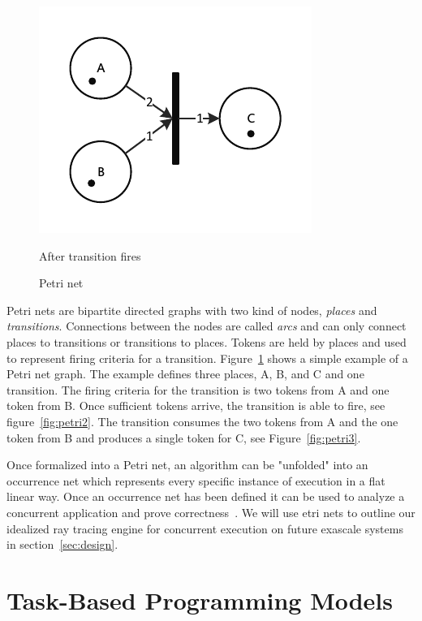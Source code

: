 \begin{figure}[!htb]
  \includegraphics[width=\linewidth]{drawings/Petri3.pdf}
  \caption{After transition fires}\label{fig:petri3}
\endminipage
\caption{Petri net}
\label{fig:petri}
\end{figure}

Petri nets are bipartite directed graphs with two kind of nodes, \emph{places}
and \emph{transitions}.  Connections between the nodes are called \emph{arcs}
and can only connect places to transitions or transitions to places.  Tokens are
held by places and used to represent firing criteria for a transition.  
Figure~\ref{fig:petri} shows a simple example of a Petri net graph.  The 
example defines three places, A, B, and C and one transition.  The firing 
criteria for the transition is two tokens from A and one token from B.  Once 
sufficient tokens arrive, the transition is able to fire, see 
figure~\ref{fig:petri2}.  The transition consumes the two tokens from A and the
one token from B and produces a single token for C, see Figure~\ref{fig:petri3}.

Once formalized into a Petri net, an algorithm can be "unfolded" into an 
occurrence net which represents every specific instance of execution in a flat
linear way.  Once an occurrence net has been defined it can be used to analyze a
concurrent application and prove correctness~\cite{franco2012true}.  We will use 
etri nets to outline our idealized ray tracing engine for concurrent execution 
on future exascale systems in section~\ref{sec:design}.  

\section{Task-Based Programming Models}
\label{sec:task-based}

